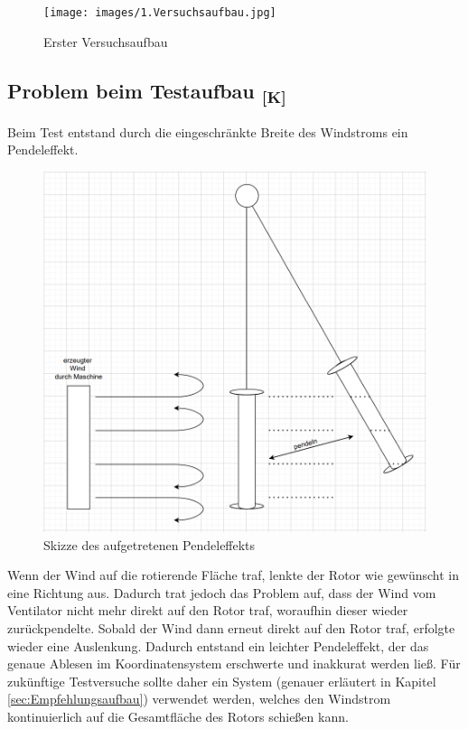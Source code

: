\documentclass[a4paper,12pt]{article}
\begin{document}
\begin{figure}[H]
    \centering
    \texttt{[image: images/1.Versuchsaufbau.jpg]}
    \caption{Erster Versuchsaufbau}
    \label{fig:1.Versuchsaufbau}
\end{figure}

\subsection{\texorpdfstring{Problem beim Testaufbau \textsubscript{[K]}}{Problem beim Testaufbau [K]}}

Beim Test entstand durch die eingeschränkte Breite des Windstroms ein Pendeleffekt. 
\begin{figure}[H]
    \centering
    \includegraphics[width=0.9\linewidth]{images/Rotorpendeln.png}
    \caption{Skizze des aufgetretenen Pendeleffekts}
    \label{fig:SKizze Pendeleffekt}
\end{figure}
Wenn der Wind auf die rotierende Fläche traf, lenkte der Rotor wie gewünscht in eine Richtung aus. Dadurch trat jedoch das Problem auf, dass der Wind vom Ventilator nicht mehr direkt auf den Rotor traf, woraufhin dieser wieder zurückpendelte. Sobald der Wind dann erneut direkt auf den Rotor traf, erfolgte wieder eine Auslenkung. Dadurch entstand ein leichter Pendeleffekt, der das genaue Ablesen im Koordinatensystem erschwerte und inakkurat werden ließ. Für zukünftige Testversuche sollte daher ein System (genauer erläutert in Kapitel \ref{sec:Empfehlungsaufbau}) verwendet werden, welches den Windstrom kontinuierlich auf die Gesamtfläche des Rotors schießen kann.
\end{document}
